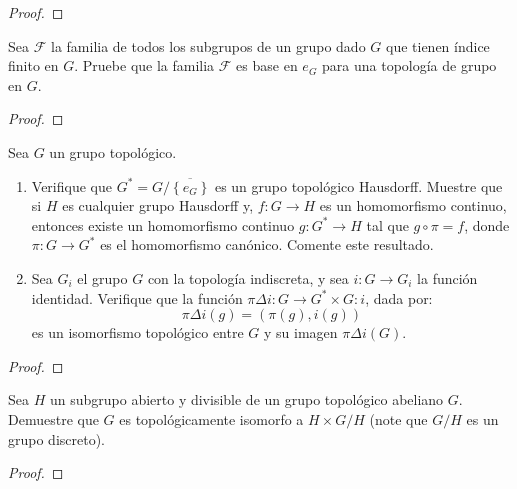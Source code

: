 \documentclass[12pt]{report}
\theoremstyle{largebreak}
\newcommand{\cf}[3]{\ensuremath{#1:#2\rightarrow#3}}
\newcommand{\Cls}[1]{\ensuremath{\overline{#1}}}
\begin{document}
    \begin{proof}
        
    \end{proof}

    \begin{excer}
        Sea $\mathcal{F}$ la familia de todos los subgrupos de un grupo dado $G$ que tienen índice finito en $G$. Pruebe que la familia $\mathcal{F}$ es base en $e_G$ para una topología de grupo en $G$.
    \end{excer}

    \begin{proof}
        
    \end{proof}

    \begin{excer}
        Sea $G$ un grupo topológico.
        \begin{enumerate}
            \item Verifique que $G^*=G/\Cls{\left\{e_G \right\}}$ es un grupo topológico Hausdorff. Muestre que si $H$ es cualquier grupo Hausdorff y, $\cf{f}{G}{H}$ es un homomorfismo continuo, entonces existe un homomorfismo continuo $\cf{g}{G^*}{H}$ tal que $g\circ\pi=f$, donde $\cf{\pi}{G}{G^*}$ es el homomorfismo canónico. Comente este resultado.
            \item Sea $G_i$ el grupo $G$ con la topología indiscreta, y sea $\cf{i}{G}{G_i}$ la función identidad. Verifique que la función $\cf{\pi\Delta i}{G}{G^*\times G:i}$, dada por:
            \begin{equation*}
                \pi\Delta i(g)=\left(\pi(g),i(g) \right)
            \end{equation*}
            es un isomorfismo topológico entre $G$ y su imagen $\pi\Delta i(G)$.
        \end{enumerate}
    \end{excer}

    \begin{proof}
        
    \end{proof}

    \begin{excer}
        Sea $H$ un subgrupo abierto y divisible de un grupo topológico abeliano $G$. Demuestre que $G$ es topológicamente isomorfo a $H\times G/H$ (note que $G/H$ es un grupo discreto).
    \end{excer}

    \begin{proof}
        
    \end{proof}
\end{document}
